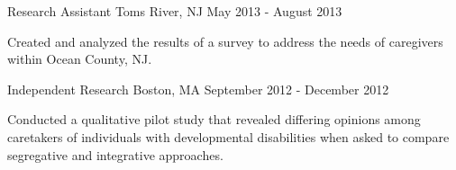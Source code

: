 \begin{cventries}
    {Research Assistant}
    {Toms River, NJ}
    {May 2013 - August 2013}
    {\begin{cvitems}
        \item{Created and analyzed the results of a 
            {survey} to address the needs of caregivers within Ocean County, NJ.}
    \end{cvitems}}
    \vspace*{0.2cm}
    
    {Independent Research}
    {Boston, MA}
    {September 2012 - December 2012}
    {\begin{cvitems}
        \item{Conducted a qualitative 
            {pilot study} that revealed differing opinions among caretakers of
            individuals with developmental disabilities when asked to compare
            segregative and integrative approaches.}
    \end{cvitems}}

\end{cventries}
